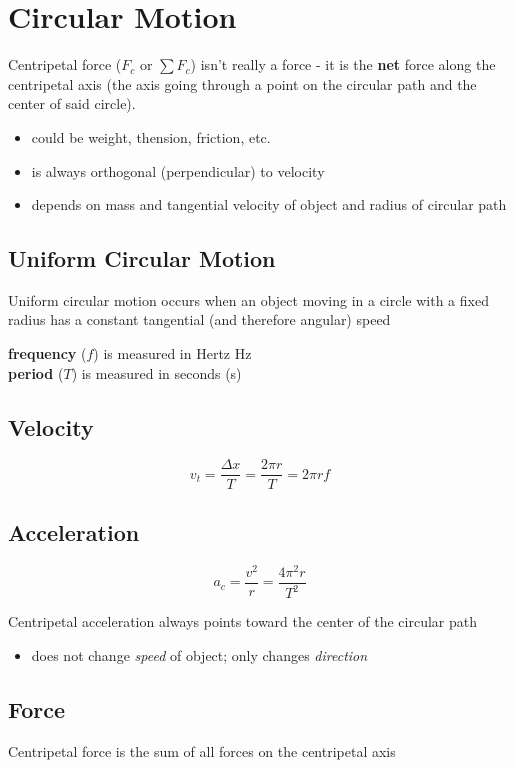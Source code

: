 \documentclass[titlepage]{article}
\begin{document}
\section{Circular Motion}
Centripetal force ($F_c$ or $\sum F_c$) isn't really a force - it is the \textbf{net} force along the centripetal axis (the axis going through a point on the circular path and the center of said circle).
\begin{itemize}
    \item could be weight, thension, friction, etc.
    \item is always orthogonal (perpendicular) to velocity
    \item depends on mass and tangential velocity of object and radius of circular path
\end{itemize}

\subsection{Uniform Circular Motion}
Uniform circular motion occurs when an object moving in a circle with a fixed radius has a constant tangential (and therefore angular) speed

\textbf{frequency} ($f$) is measured in Hertz {Hz}\\
\textbf{period} ($T$) is measured in seconds (s)

\subsection{Velocity}
\[v_t = \frac{\Delta x}{T} = \frac{2\pi r}{T} = 2\pi rf\]

\subsection{Acceleration}
\[a_c = \frac{v^2}{r} = \frac{4 \pi^2 r}{T^2}\]

Centripetal acceleration always points toward the center of the circular path
\begin{itemize}
    \item does not change \emph{speed} of object; only changes \emph{direction}
\end{itemize}

\subsection{Force}
Centripetal force is the sum of all forces on the centripetal axis
\end{document}
